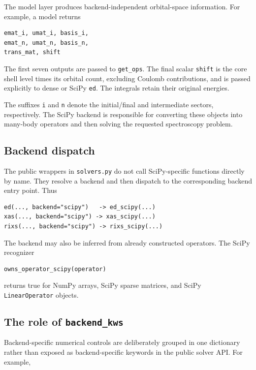 \documentclass[11pt]{article}
\begin{document}
The model layer produces backend-independent orbital-space information.  For example, a model returns

\begin{lstlisting}
emat_i, umat_i, basis_i,
emat_n, umat_n, basis_n,
trans_mat, shift
\end{lstlisting}

The first seven outputs are passed to \texttt{get\_ops}. The final scalar \texttt{shift} is the core shell level times its orbital count, excluding Coulomb contributions, and is passed explicitly to dense or SciPy \texttt{ed}. The integrals retain their original energies.

The suffixes \texttt{i} and \texttt{n} denote the initial/final and intermediate sectors, respectively.  The SciPy backend is responsible for converting these objects into many-body operators and then solving the requested spectroscopy problem.

\subsection{Backend dispatch}

The public wrappers in \texttt{solvers.py} do not call SciPy-specific functions directly by name.  They resolve a backend and then dispatch to the corresponding backend entry point.  Thus

\begin{lstlisting}
ed(..., backend="scipy")   -> ed_scipy(...)
xas(..., backend="scipy") -> xas_scipy(...)
rixs(..., backend="scipy") -> rixs_scipy(...)
\end{lstlisting}

The backend may also be inferred from already constructed operators.  The SciPy recognizer

\begin{lstlisting}
owns_operator_scipy(operator)
\end{lstlisting}

returns true for NumPy arrays, SciPy sparse matrices, and SciPy \texttt{LinearOperator} objects.

\subsection{The role of \texttt{backend\_kws}}

Backend-specific numerical controls are deliberately grouped in one dictionary rather than exposed as backend-specific keywords in the public solver API.  For example,
\end{document}
